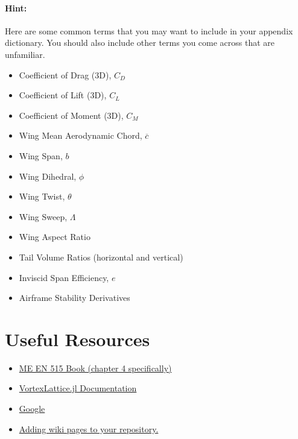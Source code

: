 \documentclass[12pt]{article}
\begin{document}
\bigskip

\paragraph{Hint:} Here are some common terms that you may want to include in your appendix dictionary. You should also include other terms you come across that are unfamiliar.

\begin{multicols}{2}
	\begin{itemize}
		\item Coefficient of Drag (3D), $C_D$
		\item Coefficient of Lift (3D), $C_L$
		\item Coefficient of Moment (3D), $C_M$
		\item Wing Mean Aerodynamic Chord, $\overline{c}$
		\item Wing Span, $b$
		\item Wing Dihedral, $\phi$
		\item Wing Twist, $\theta$
		\item Wing Sweep, $\Lambda$
		\item Wing Aspect Ratio
		\item Tail Volume Ratios (horizontal and vertical)
		\item Inviscid Span Efficiency, $e$
		\item Airframe Stability Derivatives
	\end{itemize}
\end{multicols}




\section{Useful Resources}

\begin{itemize}
	\item \href{https://byu.box.com/shared/static/ywfayozbj3sr2ot6b32u8nqk5brqvurt.pdf}{ME EN 515 Book (chapter 4 specifically)}
	\item \href{https://flow.byu.edu/VortexLattice.jl/stable/}{VortexLattice.jl Documentation}
	\item \href{https://letmegooglethat.com/?q=what+is+the+vertical+tail+volume+ratio+formula}{Google}
	\item \href{https://docs.github.com/en/communities/documenting-your-project-with-wikis/adding-or-editing-wiki-pages}{Adding wiki pages to your repository.}
\end{itemize}
\end{document}
